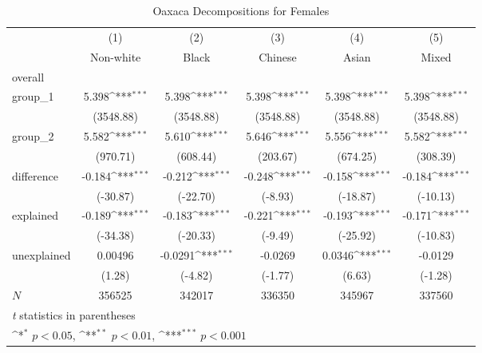 \begin{table}[htbp]\centering
\def\sym#1{\ifmmode^{#1}\else\(^{#1}\)\fi}
\caption{Oaxaca Decompositions for Females\label{tab1}}
\begin{tabular}{l*{5}{c}}
\hline\hline
            &\multicolumn{1}{c}{(1)}&\multicolumn{1}{c}{(2)}&\multicolumn{1}{c}{(3)}&\multicolumn{1}{c}{(4)}&\multicolumn{1}{c}{(5)}\\
            &\multicolumn{1}{c}{Non-white}&\multicolumn{1}{c}{Black}&\multicolumn{1}{c}{Chinese}&\multicolumn{1}{c}{Asian}&\multicolumn{1}{c}{Mixed}\\
\hline
overall     &                     &                     &                     &                     &                     \\
group\_1     &       5.398\sym{***}&       5.398\sym{***}&       5.398\sym{***}&       5.398\sym{***}&       5.398\sym{***}\\
            &   (3548.88)         &   (3548.88)         &   (3548.88)         &   (3548.88)         &   (3548.88)         \\
group\_2     &       5.582\sym{***}&       5.610\sym{***}&       5.646\sym{***}&       5.556\sym{***}&       5.582\sym{***}\\
            &    (970.71)         &    (608.44)         &    (203.67)         &    (674.25)         &    (308.39)         \\
difference  &      -0.184\sym{***}&      -0.212\sym{***}&      -0.248\sym{***}&      -0.158\sym{***}&      -0.184\sym{***}\\
            &    (-30.87)         &    (-22.70)         &     (-8.93)         &    (-18.87)         &    (-10.13)         \\
explained   &      -0.189\sym{***}&      -0.183\sym{***}&      -0.221\sym{***}&      -0.193\sym{***}&      -0.171\sym{***}\\
            &    (-34.38)         &    (-20.33)         &     (-9.49)         &    (-25.92)         &    (-10.83)         \\
unexplained &     0.00496         &     -0.0291\sym{***}&     -0.0269         &      0.0346\sym{***}&     -0.0129         \\
            &      (1.28)         &     (-4.82)         &     (-1.77)         &      (6.63)         &     (-1.28)         \\
\hline
\(N\)       &      356525         &      342017         &      336350         &      345967         &      337560         \\
\hline\hline
\multicolumn{6}{l}{\footnotesize \textit{t} statistics in parentheses}\\
\multicolumn{6}{l}{\footnotesize \sym{*} \(p<0.05\), \sym{**} \(p<0.01\), \sym{***} \(p<0.001\)}\\
\end{tabular}
\label{tab:oaxaca_female_summary}
\end{table}
